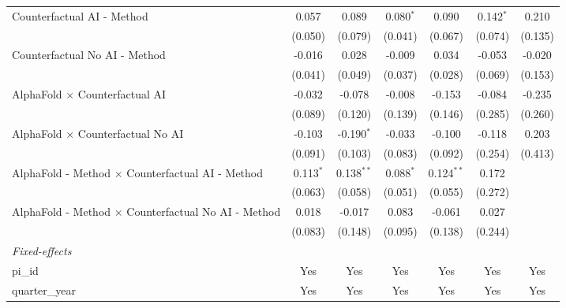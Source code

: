 \begin{tabular}{lcccccc}
   Counterfactual AI - Method                                 & 0.057        & 0.089         & 0.080$^{*}$  & 0.090        & 0.142$^{*}$  & 0.210\\   
                                                              & (0.050)      & (0.079)       & (0.041)      & (0.067)      & (0.074)      & (0.135)\\   
   Counterfactual No AI - Method                              & -0.016       & 0.028         & -0.009       & 0.034        & -0.053       & -0.020\\   
                                                              & (0.041)      & (0.049)       & (0.037)      & (0.028)      & (0.069)      & (0.153)\\   
   AlphaFold $\times$ Counterfactual AI                       & -0.032       & -0.078        & -0.008       & -0.153       & -0.084       & -0.235\\   
                                                              & (0.089)      & (0.120)       & (0.139)      & (0.146)      & (0.285)      & (0.260)\\   
   AlphaFold $\times$ Counterfactual No AI                    & -0.103       & -0.190$^{*}$  & -0.033       & -0.100       & -0.118       & 0.203\\   
                                                              & (0.091)      & (0.103)       & (0.083)      & (0.092)      & (0.254)      & (0.413)\\   
   AlphaFold - Method $\times$ Counterfactual AI - Method     & 0.113$^{*}$  & 0.138$^{**}$  & 0.088$^{*}$  & 0.124$^{**}$ & 0.172        &   \\   
                                                              & (0.063)      & (0.058)       & (0.051)      & (0.055)      & (0.272)      &   \\   
   AlphaFold - Method $\times$ Counterfactual No AI - Method  & 0.018        & -0.017        & 0.083        & -0.061       & 0.027        &   \\   
                                                              & (0.083)      & (0.148)       & (0.095)      & (0.138)      & (0.244)      &   \\   
   \midrule
   \emph{Fixed-effects}\\
   pi\_id                                                     & Yes          & Yes           & Yes          & Yes          & Yes          & Yes\\  
   quarter\_year                                              & Yes          & Yes           & Yes          & Yes          & Yes          & Yes\\  

\end{tabular}
